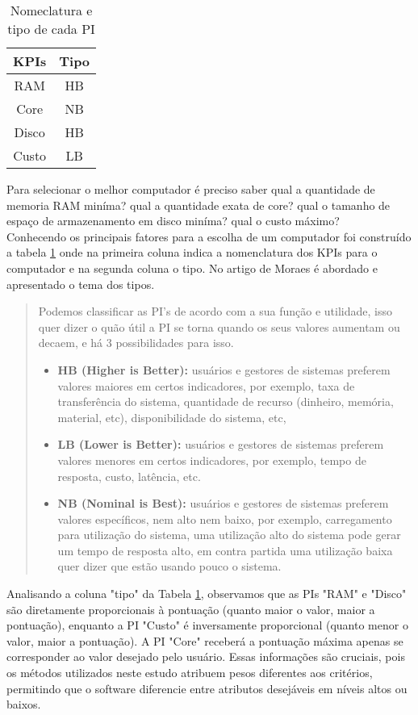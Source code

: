 \documentclass[12pt]{article}[abntex2]
\begin{document}
\begin{table}[ht]
\centering
\begin{adjustbox}{width=0.3\textwidth}
\small
\begin{tabular}{|c|c|}
   \hline
   KPIs  & Tipo \\
   \hline
   RAM  &  HB \\
   Core  & NB \\
   Disco & HB \\
   Custo & LB \\
   \hline
\end{tabular}
\end{adjustbox}
\caption{Nomeclatura e tipo de cada PI}
\label{tablePI}
\end{table} 

Para selecionar o melhor computador é preciso saber qual a quantidade de memoria RAM miníma? qual a quantidade exata de core? qual o tamanho de espaço de armazenamento em disco miníma? qual o custo máximo?\\
Conhecendo os principais fatores para a escolha de um computador foi construído a tabela \ref{tablePI} onde na primeira coluna indica a nomenclatura dos KPIs para o computador e na segunda coluna o tipo. No artigo de Moraes \cite{Borges_Fiorese_2018} é abordado e apresentado o tema dos tipos.\\
\begin{quote}
\fontsize{11}{12}\selectfont
    Podemos classificar as PI’s de acordo com a sua função e utilidade, isso quer dizer o quão útil a PI se torna quando os seus valores aumentam ou decaem, e há 3 possibilidades para isso.
\begin{itemize}
    \item \textbf{HB (Higher is Better):} usuários e gestores de sistemas preferem valores maiores em certos indicadores, por exemplo, taxa de transferência do sistema, quantidade de recurso (dinheiro, memória, material, etc), disponibilidade do sistema, etc,  
    \item \textbf{LB (Lower is Better):} usuários e gestores de sistemas preferem valores menores em certos indicadores, por exemplo, tempo de resposta, custo, latência, etc.  
    \item  \textbf{NB (Nominal is Best):} usuários e gestores de sistemas preferem valores específicos, nem alto nem baixo, por exemplo, carregamento para utilização do sistema, uma utilização alto do sistema pode gerar um tempo de resposta alto, em contra partida uma utilização baixa quer dizer que estão usando pouco o sistema.
\end{itemize}
\end{quote}
Analisando a coluna "tipo" da Tabela \ref{tablePI}, observamos que as PIs "RAM" e "Disco" são diretamente proporcionais à pontuação (quanto maior o valor, maior a pontuação), enquanto a PI "Custo" é inversamente proporcional (quanto menor o valor, maior a pontuação). A PI "Core" receberá a pontuação máxima apenas se corresponder ao valor desejado pelo usuário. Essas informações são cruciais, pois os métodos utilizados neste estudo atribuem pesos diferentes aos critérios, permitindo que o software diferencie entre atributos desejáveis em níveis altos ou baixos.
\end{document}
